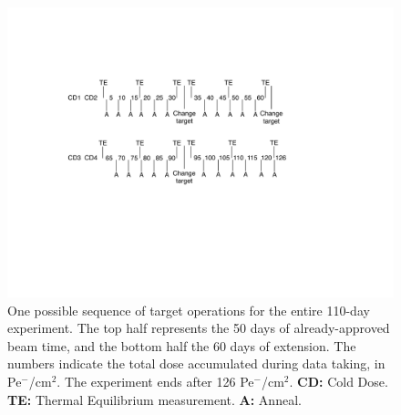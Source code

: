 \begin{figure}
\begin{center}
\includegraphics[width=6in]{Operation_110days.pdf}
\end{center}
\caption[Overhead operations of the target]
{One possible sequence of target operations for the entire 110-day experiment. The top half represents the 50 days of already-approved beam time, and the bottom half the 60 days of extension. The numbers indicate the total dose accumulated during data taking, in Pe$^-$/cm$^2$. The experiment ends after 126 Pe$^-$/cm$^2$. 
{\bf CD:} Cold Dose. {\bf TE:} Thermal Equilibrium measurement. {\bf A:} Anneal.}
\label{Operation}
\end{figure}


